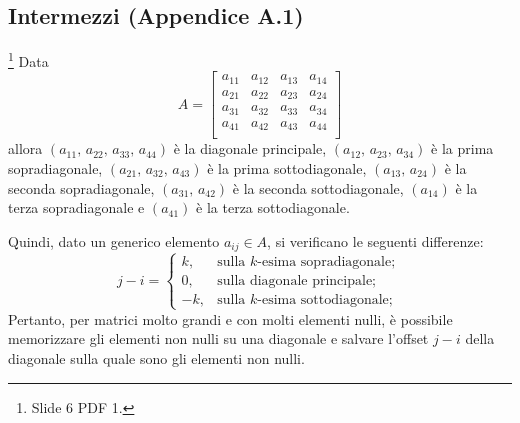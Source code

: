 \subsection{Intermezzi (Appendice A.1)}
\begin{remark}\label{rem:diagonali}\footnote{Slide 6 PDF 1.}
	Data
    \begin{equation*}
        A=\begin{bmatrix}
            a_{11} & a_{12} & a_{13} & a_{14}\\
            a_{21} & a_{22} & a_{23} & a_{24}\\
            a_{31} & a_{32} & a_{33} & a_{34}\\
            a_{41} & a_{42} & a_{43} & a_{44}\\
        \end{bmatrix}
    \end{equation*}
    allora $(a_{11},\, a_{22},\, a_{33},\, a_{44})$ è la diagonale principale, $(a_{12},\, a_{23},\, a_{34})$ è la prima sopradiagonale, $(a_{21},\, a_{32},\, a_{43})$ è la prima sottodiagonale, $(a_{13},\, a_{24})$ è la seconda sopradiagonale,  $(a_{31},\, a_{42})$ è la seconda sottodiagonale, $(a_{14})$ è la terza sopradiagonale e $(a_{41})$ è la terza sottodiagonale. 
	
	\noindent Quindi, dato un generico elemento $a_{ij}\in A$, si verificano le seguenti differenze: 
    \begin{equation*}
        j-i=\begin{cases}
        k, &\text{sulla $k$-esima sopradiagonale};\\
        0, &\text{sulla diagonale principale};\\
        -k, &\text{sulla $k$-esima sottodiagonale};
    \end{cases}
    \end{equation*}
    Pertanto, per matrici molto grandi e con molti elementi nulli, è possibile memorizzare gli elementi non nulli su una  diagonale e salvare l'offset $j-i$ della diagonale sulla quale sono gli elementi non nulli.
\end{remark}

